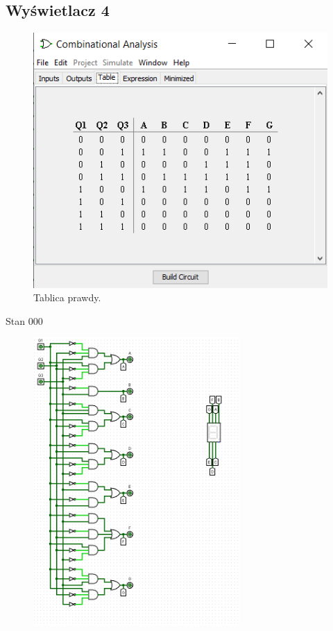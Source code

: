 \documentclass[]{article}
\begin{document}
\subsection{Wyświetlacz 4}
\begin{figure}[H]
	\centering
	\includegraphics[width=1\textwidth]{CZTERY_Tab.png}
	\caption{Tablica prawdy.}
\end{figure}
\newpage
Stan 000
\begin{figure}[H]
	\centering
	\includegraphics[width=0.7\textwidth]{CZTERY_000.png}
\end{figure}
\end{document}
